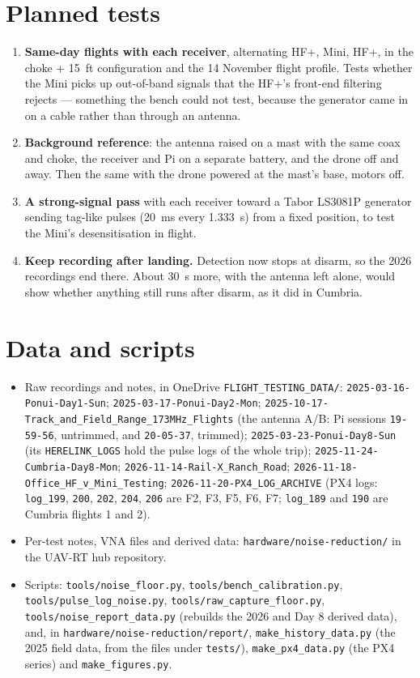 \documentclass[11pt]{article}
\begin{document}
\section{Planned tests}
\label{sec:next}
\begin{enumerate}
\item \textbf{Same-day flights with each receiver}, alternating HF+, Mini, HF+, in the choke + 15~ft
configuration and the 14 November flight profile. Tests whether the Mini picks up out-of-band
signals that the HF+'s front-end filtering rejects --- something the bench could not test, because
the generator came in on a cable rather than through an antenna.
\item \textbf{Background reference}: the antenna raised on a mast with the same coax and choke, the
receiver and Pi on a separate battery, and the drone off and away. Then the same with the drone
powered at the mast's base, motors off.
\item \textbf{A strong-signal pass} with each receiver toward a Tabor LS3081P generator sending tag-like
pulses (20~ms every 1.333~s) from a fixed position, to test the Mini's desensitisation in flight.
\item \textbf{Keep recording after landing.} Detection now stops at disarm, so the 2026 recordings end
there. About 30~s more, with the antenna left alone, would show whether anything still runs after
disarm, as it did in Cumbria.
\end{enumerate}

\appendix
\section{Data and scripts}
{\raggedright
\begin{itemize}
\item Raw recordings and notes, in OneDrive \texttt{FLIGHT\_TESTING\_DATA/}:
  \texttt{2025-03-16-Ponui-Day1-Sun}; \texttt{2025-03-17-Ponui-Day2-Mon};
  \texttt{2025-10-17-Track\_and\_Field\_Range\_173MHz\_Flights} (the antenna A/B: Pi sessions
  \texttt{19-59-56}, untrimmed, and \texttt{20-05-37}, trimmed);
  \texttt{2025-03-23-Ponui-Day8-Sun} (its \texttt{HERELINK\_LOGS} hold the pulse logs of the whole
  trip); \texttt{2025-11-24-Cumbria-Day8-Mon}; \texttt{2026-11-14-Rail-X\_Ranch\_Road};
  \texttt{2026-11-18-Office\_HF\_v\_Mini\_Testing}; \texttt{2026-11-20-PX4\_LOG\_ARCHIVE} (PX4 logs:
  \texttt{log\_199}, \texttt{200}, \texttt{202}, \texttt{204}, \texttt{206} are F2, F3, F5, F6, F7;
  \texttt{log\_189} and \texttt{190} are Cumbria flights 1 and 2).
\item Per-test notes, VNA files and derived data: \texttt{hardware/noise-reduction/} in the UAV-RT hub
repository.
\item Scripts: \texttt{tools/noise\_floor.py}, \texttt{tools/bench\_calibration.py},
\texttt{tools/pulse\_log\_noise.py}, \texttt{tools/raw\_capture\_floor.py},
\texttt{tools/noise\_report\_data.py} (rebuilds the 2026 and Day 8 derived data), and, in
\texttt{hardware/noise-reduction/report/}, \texttt{make\_history\_data.py} (the 2025 field data, from
the files under \texttt{tests/}), \texttt{make\_px4\_data.py} (the PX4 series) and
\texttt{make\_figures.py}.
\end{itemize}
}
\end{document}
